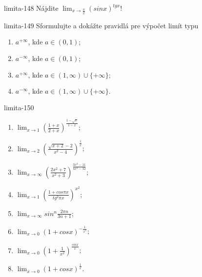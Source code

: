 \begin{defproblem}{limita-148}
Nájdite $\lim_{x \rightarrow \frac{\pi}{2}} (sin x)^{tg x}$!
\end{defproblem}

\begin{defproblem}{limita-149}
Sformulujte a dokážte pravidlá pre výpočet limít typu
\begin{multicols}{2}
\begin{enumerate}
    \item $a^{+\infty}$, kde $a \in (0,1)$;
    \item $a^{-\infty}$, kde $a \in (0,1)$;
    \item $a^{+\infty}$, kde $a \in (1,\infty) \cup \{+\infty \}$;
    \item $a^{-\infty}$, kde $a \in (1,\infty) \cup \{+\infty \}$.
\end{enumerate}
\end{multicols}
\end{defproblem}

\begin{defproblem}{limita-150}
\begin{multicols}{2}
\begin{enumerate}
    \item $\lim_{{x \rightarrow 1}} (\frac{1+x}{2+x})^{\frac{1-\sqrt{x}}{1-x}}$;
    \item $\lim_{{x \rightarrow 2}} (\frac{\sqrt{x+2}-2}{x^2-4})^{\frac{1}{x}}$;
    \item $\lim_{{x \rightarrow \infty}} (\frac{2x^2+7}{x^2+3})^{\frac{3x^3-11}{4x^2-12}}$;
    \item $\lim_{{x \rightarrow 1}} (\frac{1+cos \pi x}{tg ^2 \pi x})^{x^2}$;
    \item $\lim_{{x \rightarrow \infty}} sin ^n \frac{2 \pi n}{3n+1}$;
    \item $\lim_{{x \rightarrow 0}} (1+cos x)^{-\frac{1}{x^2}}$;
    \item $\lim_{{x \rightarrow 0}} (1+\frac{1}{x^2})^{\frac{sin x}{x}}$;
    \item $\lim_{{x \rightarrow 0}} (1+cos x)^{\frac{1}{x}}$.
\end{enumerate}
\end{multicols}
\end{defproblem}

